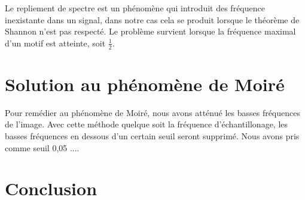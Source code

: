 \documentclass[a4paper,11pt]{article}
\begin{document}
  Le repliement de spectre est un phénomène qui introduit des fréquence inexistante dans un signal, dans notre cas cela se produit lorsque le théorème de Shannon n’est pas respecté.
  Le problème survient lorsque la fréquence maximal d’un motif est atteinte, soit $\frac{1}{2}$.\\

  \section{Solution au phénomène de Moiré}
  
  Pour remédier au phénomène de Moiré, nous avons atténué les basses fréquences de l'image. Avec cette méthode quelque soit la fréquence
  d'échantillonage, les basses fréquences en dessous d'un certain seuil seront supprimé. Nous avons pris comme seuil 0,05 ....
  
  \section{Conclusion}
  
\end{document}
